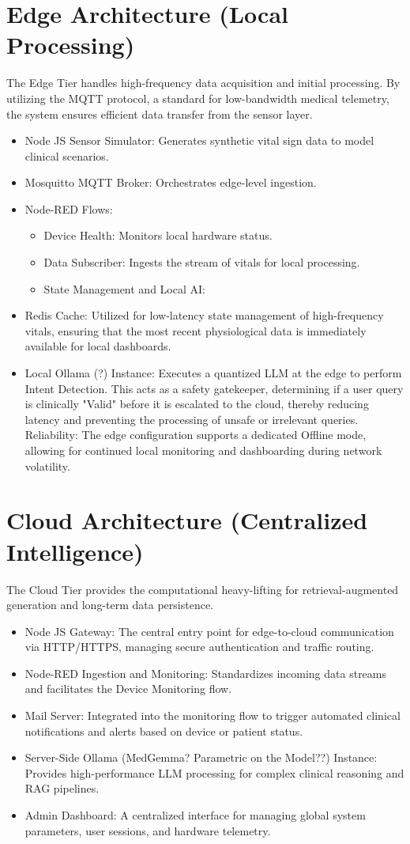 \documentclass[runningheads]{llncs}
\begin{document}
\section{Edge Architecture (Local Processing)}
The Edge Tier handles high-frequency data acquisition and initial processing. By utilizing the MQTT protocol, a standard for low-bandwidth medical telemetry, the system ensures efficient data transfer from the sensor layer.
\begin{itemize}
\item Node JS Sensor Simulator: Generates synthetic vital sign data to model clinical scenarios.
\item Mosquitto MQTT Broker: Orchestrates edge-level ingestion.
\item Node-RED Flows:
\begin{itemize}
\item Device Health: Monitors local hardware status.
\item Data Subscriber: Ingests the stream of vitals for local processing.
\item State Management and Local AI:
\end{itemize}
\item Redis Cache: Utilized for low-latency state management of high-frequency vitals, ensuring that the most recent physiological data is immediately available for local dashboards.
\item  Local Ollama (?) Instance: Executes a quantized LLM at the edge to perform Intent Detection. This acts as a safety gatekeeper, determining if a user query is clinically "Valid" before it is escalated to the cloud, thereby reducing latency and preventing the processing of unsafe or irrelevant queries.
Reliability: The edge configuration supports a dedicated Offline mode, allowing for continued local monitoring and dashboarding during network volatility.
\end{itemize}

\section{Cloud Architecture (Centralized Intelligence)}
The Cloud Tier provides the computational heavy-lifting for retrieval-augmented generation and long-term data persistence.
\begin{itemize}
\item Node JS Gateway: The central entry point for edge-to-cloud communication via HTTP/HTTPS, managing secure authentication and traffic routing.
\item  Node-RED Ingestion and Monitoring: Standardizes incoming data streams and facilitates the Device Monitoring flow.
\item Mail Server: Integrated into the monitoring flow to trigger automated clinical notifications and alerts based on device or patient status.
\item  Server-Side Ollama (MedGemma? Parametric on the Model??) Instance: Provides high-performance LLM processing for complex clinical reasoning and RAG pipelines.
\item 
Admin Dashboard: A centralized interface for managing global system parameters, user sessions, and hardware telemetry.
\end{itemize}
\end{document}

